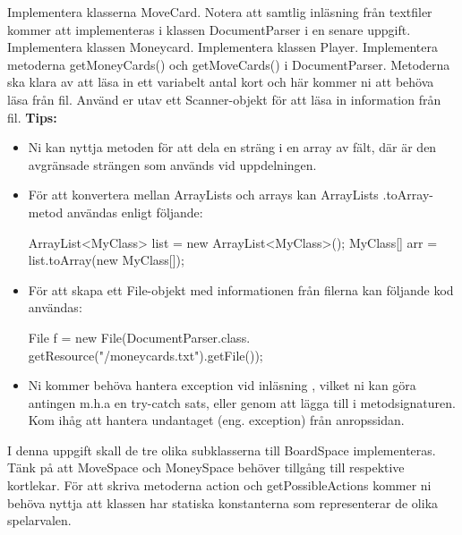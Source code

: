 \Subtask Implementera klasserna MoveCard. Notera att samtlig inläsning från textfiler kommer att implementeras i klassen DocumentParser i en senare uppgift.
\newline
\Subtask Implementera klassen Moneycard.
\newline
\Subtask Implementera klassen Player.
\newline
\Subtask Implementera metoderna getMoneyCards() och getMoveCards() i DocumentParser. Metoderna ska klara av att läsa in ett variabelt antal kort och här kommer ni att behöva läsa från fil. 
Använd er utav ett Scanner-objekt för att läsa in information från fil.
\newline
\newline
\textbf{Tips:}
\begin{itemize}
\item Ni kan nyttja metoden  för att dela en sträng i en array av fält, där  är den avgränsade strängen som används vid uppdelningen.

\item För att konvertera mellan ArrayLists och arrays kan ArrayLists .toArray-metod användas enligt följande:

\begin{Code}
ArrayList<MyClass> list = new ArrayList<MyClass>();
MyClass[] arr = list.toArray(new MyClass[]{});
\end{Code}

\item För att skapa ett File-objekt med informationen från filerna kan följande kod användas:
\newline
\begin{Code}
File f = new File(DocumentParser.class.
        getResource("/moneycards.txt").getFile());
\end{Code}

\item Ni kommer behöva hantera exception vid inläsning , vilket ni kan göra antingen m.h.a en try-catch sats, eller genom att lägga till \newline
{} i metodsignaturen. Kom ihåg att hantera undantaget (eng. exception) från anropssidan.

\end{itemize}
\Task I denna uppgift skall de tre olika subklasserna till BoardSpace implementeras. Tänk på att MoveSpace och MoneySpace behöver tillgång till respektive kortlekar.
För att skriva metoderna action och getPossibleActions kommer ni behöva nyttja att klassen  har statiska konstanterna som representerar de olika spelarvalen.


